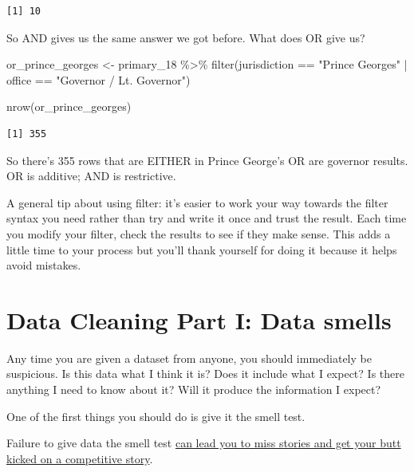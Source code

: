 \documentclass[
  letterpaper,
  DIV=11,
  numbers=noendperiod]{scrreprt}
\newenvironment{Shaded}{\begin{snugshade}}{\end{snugshade}}
\newcommand{\FunctionTok}[1]{\textcolor[rgb]{0.28,0.35,0.67}{#1}}
\newcommand{\NormalTok}[1]{\textcolor[rgb]{0.00,0.23,0.31}{#1}}
\newcommand{\OtherTok}[1]{\textcolor[rgb]{0.00,0.23,0.31}{#1}}
\newcommand{\SpecialCharTok}[1]{\textcolor[rgb]{0.37,0.37,0.37}{#1}}
\newcommand{\StringTok}[1]{\textcolor[rgb]{0.13,0.47,0.30}{#1}}
\begin{document}
\begin{verbatim}
[1] 10
\end{verbatim}

So AND gives us the same answer we got before. What does OR give us?

\begin{Shaded}
\begin{Highlighting}[]
\NormalTok{or\_prince\_georges }\OtherTok{\textless{}{-}}\NormalTok{ primary\_18 }\SpecialCharTok{\%\textgreater{}\%} \FunctionTok{filter}\NormalTok{(jurisdiction }\SpecialCharTok{==} \StringTok{"Prince George\textquotesingle{}s"} \SpecialCharTok{|}\NormalTok{ office }\SpecialCharTok{==} \StringTok{"Governor / Lt. Governor"}\NormalTok{)}

\FunctionTok{nrow}\NormalTok{(or\_prince\_georges)}
\end{Highlighting}
\end{Shaded}

\begin{verbatim}
[1] 355
\end{verbatim}

So there's 355 rows that are EITHER in Prince George's OR are governor
results. OR is additive; AND is restrictive.

A general tip about using filter: it's easier to work your way towards
the filter syntax you need rather than try and write it once and trust
the result. Each time you modify your filter, check the results to see
if they make sense. This adds a little time to your process but you'll
thank yourself for doing it because it helps avoid mistakes.


\hypertarget{data-cleaning-part-i-data-smells}{%
\chapter{Data Cleaning Part I: Data
smells}\label{data-cleaning-part-i-data-smells}}

Any time you are given a dataset from anyone, you should immediately be
suspicious. Is this data what I think it is? Does it include what I
expect? Is there anything I need to know about it? Will it produce the
information I expect?

One of the first things you should do is give it the smell test.

Failure to give data the smell test
\href{https://source.opennews.org/en-US/learning/handling-data-about-race-and-ethnicity/}{can
lead you to miss stories and get your butt kicked on a competitive
story}.
\end{document}
